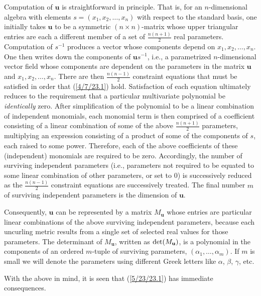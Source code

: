 \documentclass{amsart}
\numberwithin{equation}{section}
\theoremstyle{definition}
\numberwithin{theorem}{section}
\begin{document}
Computation of $\mathbf{u}$ is straightforward in principle.  That is, for an $n$-dimensional algebra with elements $s = (x_1,x_2,\dots,x_n)$ with respect to the standard basis, one initially takes $\mathbf{u}$ to be a symmetric $(n\times n)$-matrix  whose upper triangular entries are each a different member of a set of $\frac{n(n+1)}{2}$ real parameters.  Computation of $s^{-1}$ produces a vector whose components depend on $x_1,x_2,\dots,x_n$.  One then writes down the components of $\mathbf{u}s^{-1}$, i.e., a parametrized $n$-dimensional vector field whose components are dependent on the parameters in the matrix $\mathbf{u}$ and $x_1,x_2,\dots,x_n$.  There are then $\frac{n(n-1)}{2}$ constraint equations that must be satisfied in order that (\ref{4/7/23.1}) hold.  Satisfaction of each equation ultimately reduces to the requirement that a particular multivariate polynomial be {\it identically} zero.  After simplification of the polynomial to be a linear combination of independent monomials, each monomial term is then comprised of a coefficient consisting of a linear combination of some of the above $\frac{n(n+1)}{2}$ parameters, multiplying an expression consisting of a product of some of the components of $s$, each raised to some power.  Therefore, each of the above coefficients of these (independent) monomials are required to be zero.  Accordingly, the number of surviving independent parameters (i.e., parameters not required to be equated to some linear combination of other parameters, or set to 0) is successively reduced as the $\frac{n(n-1)}{2}$ constraint equations are successively treated.  The final number $m$ of surviving independent parameters is the dimension of $\mathbf{u}$.

Consequently, $\mathbf{u}$ can be represented by a matrix  $M_{\mathbf{u}}$ whose entries are particular linear combinations of the above surviving independent parameters, because each uncurling metric results from a single set of selected real values for those parameters.  The determinant of $M_{\mathbf{u}}$, written as ${\rm det}(M_{\mathbf{u}})$, is a polynomial in the components of an ordered $m$-tuple of surviving parameters, $(\alpha_1,\dots,\alpha_m)$.  If $m$ is small  we will denote the parameters using different Greek letters like $\alpha$, $\beta$, $\gamma$, etc. 

   With the above in mind, it is seen that (\ref{5/23/23.1}) has immediate consequences. 
                 
\end{document}
